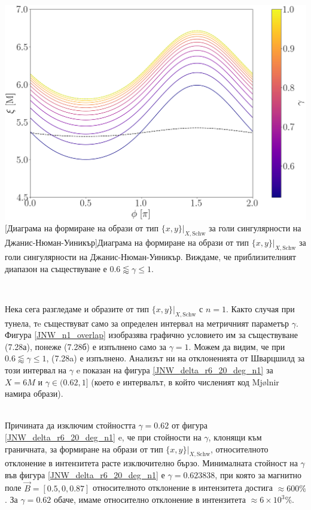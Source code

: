 \begin{minipage}{16em}
	\hspace{-0.3cm}
	\includegraphics[scale = 0.18]{JNW_indirect_overlap_grapth.png}
	[Диаграма на формиране на образи от тип $\{x,y\}\vert_{X, \text{Schw}}$ за голи сингулярности на Джанис-Нюман-Уиникър]{Диаграма на формиране на образи от тип $\{x,y\}\vert_{X, \text{Schw}}$ за голи сингулярности на Джанис-Нюман-Уиникър. Виждаме, че приблизителният диапазон на съществуване е $0.6 \lessapprox \gamma \le 1$.} 
	\label{JNW_n1_overlap}
\end{minipage}\,\,
\begin{minipage}{20em}
	Нека сега разгледаме и образите от тип $\{x,y\}\vert_{X, \text{Schw}}$ с $n = 1$. Както случая при тунела, тe съществуват само за определен интервал на метричният параметър $\gamma$. Фигура \ref{JNW_n1_overlap} изобразява графично условието им за съществуване (7.28а), понеже (7.28б) е изпълнено само за $\gamma = 1$. Можем да видим, че при  $0.6 \lessapprox \gamma \le 1$, (7.28a) е изпълнено. Анализът ни на отклоненията от Шварцшилд за този интервал на $\gamma$ e показан на фигура \ref{JNW_delta_r6_20_deg_n1} за $X = 6M$ и $\gamma\in(0.62, 1]$ (което е интервалът, в който численият код Mjølnir намира образи).
\end{minipage}\\

Причината да изключим стойността $\gamma = 0.62$ от фигура \ref{JNW_delta_r6_20_deg_n1} e, че при стойности на $\gamma$, клонящи към граничната, за формиране на образи от тип $\{x,y\}\vert_{X, \text{Schw}}$, относителното отклонение в интензитета расте изключително бързо. Минималната стойност на $\gamma$ във фигура \ref{JNW_delta_r6_20_deg_n1} е $\gamma = 0.623838$, при която за магнитно поле $\vec{B} = [0.5, 0, 0.87]$ относителното отклонение в интензитета достига $\approx 600\%$. За $\gamma = 0.62$ обаче, имаме относително отклонение в интензитета $\approx 6\times 10^3 \%$.\\

